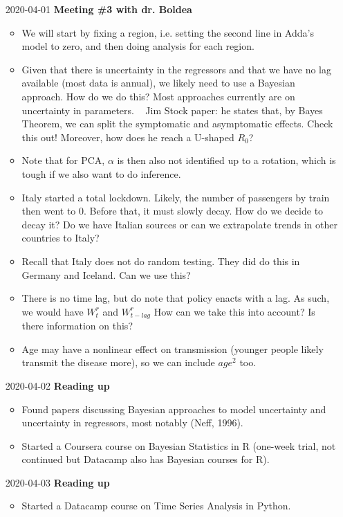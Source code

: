 \documentclass{article}
\begin{document}
\begin{itemize}
	\item[2020-04-01]
	\textbf{Meeting \#3 with dr. Boldea}
	\begin{itemize}
		\item We will start by fixing a region, i.e. setting the second line in Adda's model to zero, and then doing analysis for each region.
		\item Given that there is uncertainty in the regressors and that we have no lag available (most data is annual), we likely need to use a Bayesian approach. How do we do this? Most approaches currently are on uncertainty in parameters.
			\subitem \textbullet~ Jim Stock paper: he states that, by Bayes Theorem, we can split the symptomatic and asymptomatic effects. Check this out! Moreover, how does he reach a U-shaped $R_0$?
		\item Note that for PCA, $\alpha$ is then also not identified up to a rotation, which is tough if we also want to do inference.
		\item Italy started a total lockdown. Likely, the number of passengers by train then went to 0. Before that, it must slowly decay. How do we decide to decay it? Do we have Italian sources or can we extrapolate trends in other countries to Italy?
		\item Recall that Italy does not do random testing. They did do this in Germany and Iceland. Can we use this?
		\item There is no time lag, but do note that policy enacts with a lag. As such, we would have $W^r_t$ and $W^r_{t-lag}$ How can we take this into account? Is there information on this? 
		\item Age may have a nonlinear effect on transmission (younger people likely transmit the disease more), so we can include $age^2$ too.
	\end{itemize}
	
	\item[2020-04-02]
	\textbf{Reading up}
	\begin{itemize}
		\item Found papers discussing Bayesian approaches to model uncertainty and uncertainty in regressors, most notably (Neff, 1996).
		\item Started a Coursera course on Bayesian Statistics in R (one-week trial, not continued but Datacamp also has Bayesian courses for R).
	\end{itemize}
	
	\item[2020-04-03]
	\textbf{Reading up}
	\begin{itemize}
		\item Started a Datacamp course on Time Series Analysis in Python.
	\end{itemize}


\end{itemize}
\end{document}
